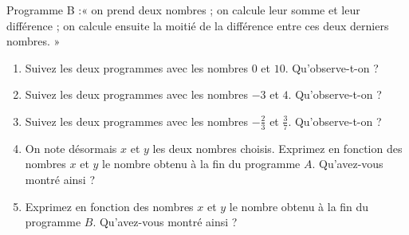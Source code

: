 \documentclass[14 pt, fleqn]{extarticle}
\theoremstyle{plain}
\begin{document}
 Programme B :« on prend deux nombres ; on calcule leur somme et leur différence ; on calcule ensuite la moitié de la différence entre ces deux derniers nombres. »
 \begin{enumerate}
 \item Suivez les deux programmes avec les nombres $0$ et $10$. Qu'observe-t-on ? 
 \item Suivez les deux programmes avec les nombres $-3$ et $4$.  Qu'observe-t-on ? 
 \item Suivez les deux programmes avec les nombres $-\frac23$ et $\frac37$.  Qu'observe-t-on ? 
 \item On note désormais $x$ et $y$ les deux nombres choisis. Exprimez en fonction des nombres $x$ et $y$ le nombre obtenu à la fin du programme $A$. Qu'avez-vous montré ainsi ? 
 \item Exprimez en fonction des nombres $x$ et $y$ le nombre obtenu à la fin du programme $B$. Qu'avez-vous montré ainsi ? 
 \end{enumerate}
 	
\end{document}
